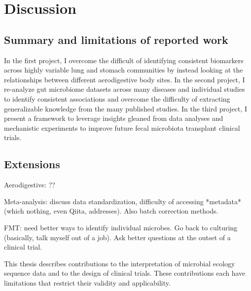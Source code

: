 \chapter{Discussion}

\section{Summary and limitations of reported work}

In the first project, I overcome the difficult of identifying consistent biomarkers across highly variable lung and stomach communities by instead looking at the relationships between different aerodigestive body sites.
In the second project, I re-analyze gut microbiome datasets across many diseases and individual studies to identify consistent associations and overcome the difficulty of extracting generalizable knowledge from the many published studies.
In the third project, I present a framework to leverage insights gleaned from data analyses and mechanistic experiments to improve future fecal microbiota transplant clinical trials.

\section{Extensions}

Aerodigestive: ??

Meta-analysis: discuss data standardization, difficulty of accessing *metadata* (which nothing, even Qiita, addresses). Also batch correction methods.

FMT: need better ways to identify individual microbes. Go back to culturing (basically, talk myself out of a job). Ask better questions at the outset of a clinical trial.

This thesis describes contributions to the interpretation of microbial
ecology sequence data and to the design of clinical trials. These contributions
each have limitations that restrict their validity and applicability.

